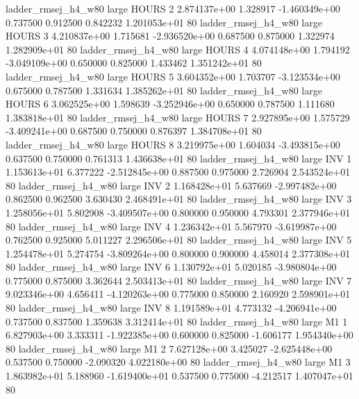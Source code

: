 ladder_rmsej_h4_w80      large    HOURS                 2 2.874137e+00      1.328917 -1.460349e+00 0.737500 0.912500       0.842232 1.201053e+01 80
ladder_rmsej_h4_w80      large    HOURS                 3 4.210837e+00      1.715681 -2.936520e+00 0.687500 0.875000       1.322974 1.282909e+01 80
ladder_rmsej_h4_w80      large    HOURS                 4 4.074148e+00      1.794192 -3.049109e+00 0.650000 0.825000       1.433462 1.351242e+01 80
ladder_rmsej_h4_w80      large    HOURS                 5 3.604352e+00      1.703707 -3.123534e+00 0.675000 0.787500       1.331634 1.385262e+01 80
ladder_rmsej_h4_w80      large    HOURS                 6 3.062525e+00      1.598639 -3.252946e+00 0.650000 0.787500       1.111680 1.383818e+01 80
ladder_rmsej_h4_w80      large    HOURS                 7 2.927895e+00      1.575729 -3.409241e+00 0.687500 0.750000       0.876397 1.384708e+01 80
ladder_rmsej_h4_w80      large    HOURS                 8 3.219975e+00      1.604034 -3.493815e+00 0.637500 0.750000       0.761313 1.436638e+01 80
ladder_rmsej_h4_w80      large      INV                 1 1.153613e+01      6.377222 -2.512845e+00 0.887500 0.975000       2.726904 2.543524e+01 80
ladder_rmsej_h4_w80      large      INV                 2 1.168428e+01      5.637669 -2.997482e+00 0.862500 0.962500       3.630430 2.468491e+01 80
ladder_rmsej_h4_w80      large      INV                 3 1.258056e+01      5.802908 -3.409507e+00 0.800000 0.950000       4.793301 2.377946e+01 80
ladder_rmsej_h4_w80      large      INV                 4 1.236342e+01      5.567970 -3.619987e+00 0.762500 0.925000       5.011227 2.296506e+01 80
ladder_rmsej_h4_w80      large      INV                 5 1.254478e+01      5.274754 -3.809264e+00 0.800000 0.900000       4.458014 2.377308e+01 80
ladder_rmsej_h4_w80      large      INV                 6 1.130792e+01      5.020185 -3.980804e+00 0.775000 0.875000       3.362644 2.503413e+01 80
ladder_rmsej_h4_w80      large      INV                 7 9.023346e+00      4.656411 -4.120263e+00 0.775000 0.850000       2.160920 2.598901e+01 80
ladder_rmsej_h4_w80      large      INV                 8 1.191589e+01      4.773132 -4.206941e+00 0.737500 0.837500       1.359638 3.312414e+01 80
ladder_rmsej_h4_w80      large       M1                 1 6.827903e+00      3.333311 -1.922385e+00 0.600000 0.825000      -1.606177 1.954340e+00 80
ladder_rmsej_h4_w80      large       M1                 2 7.627128e+00      3.425027 -2.625448e+00 0.537500 0.750000      -2.090320 4.022180e+00 80
ladder_rmsej_h4_w80      large       M1                 3 1.863982e+01      5.188960 -1.619400e+01 0.537500 0.775000      -4.212517 1.407047e+01 80
